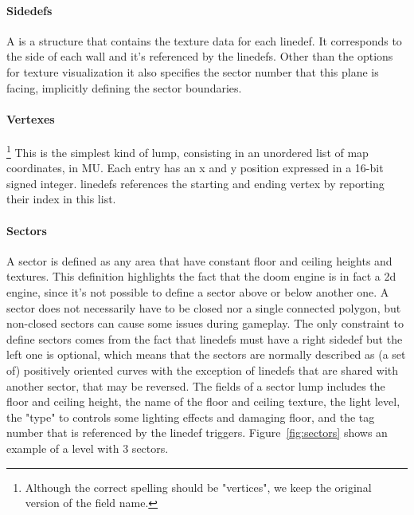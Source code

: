 \paragraph{Sidedefs} A  is a structure that contains the texture data for each linedef. It corresponds to the side of each wall and it's referenced by the linedefs. Other than the options for texture visualization it also specifies the sector number that this plane is facing, implicitly defining the sector boundaries.

\paragraph{Vertexes}\footnote{Although the correct spelling should be "vertices", we keep the original version of the field name.} This is the simplest kind of \gls{lump}, consisting in an unordered list of map coordinates, in \gls{MU}. Each entry has an x and y position expressed in a 16-bit signed integer. \glspl{linedef} references the starting and ending vertex by reporting their index in this list.

\paragraph{Sectors} A sector is defined as any area that have constant floor and ceiling heights and textures. This definition highlights the fact that the doom engine is in fact a 2d engine, since it's not possible to define a sector above or below another one. A sector does not necessarily have to be closed nor a single connected polygon, but non-closed sectors can cause some issues during gameplay. The only constraint to define sectors comes from the fact that linedefs must have a right sidedef but the left one is optional, which means that the sectors are normally described as (a set of) positively oriented curves \cite{poly_orient} with the exception of linedefs that are shared with another sector, that may be reversed. The fields of a sector lump includes the floor and ceiling height, the name of the floor and ceiling texture, the light level, the "type" to controls some lighting effects and damaging floor, and the tag number that is referenced by the linedef triggers. Figure~\ref{fig:sectors} shows an example of a level with 3 sectors.



